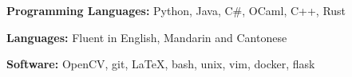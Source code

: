 \documentclass{resume}
\begin{document}
    \begin{smalldescription}
        \item \textbf{Programming Languages:} Python, Java, C\#, OCaml, C++,
            Rust
        \item \textbf{Languages: } Fluent in English, Mandarin and Cantonese
        \item \textbf{Software:} OpenCV, git, \LaTeX, bash, unix, vim, docker,
            flask
    \end{smalldescription}
\end{document}
